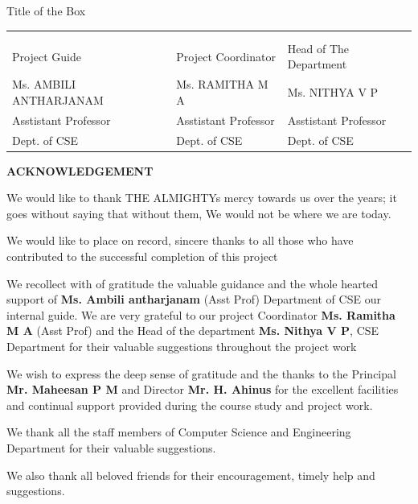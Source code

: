 \documentclass[12pt]{article}
\begin{document}
\begin{boxed}{Title of the Box}
\begin{center}
\begin{tabularx}{1\textwidth} { 
  >{\raggedright\arraybackslash}X 
   >{\raggedright\arraybackslash}X 
   >{\raggedright\arraybackslash}X }
\\  \\ \\ 

Project Guide & Project Coordinator & Head of The Department  \\  
Ms. AMBILI ANTHARJANAM  & Ms. RAMITHA  M A & Ms. NITHYA V P \\ 
Asstistant Professor  & Asstistant Professor &Asstistant Professor \\ 
Dept. of CSE & Dept. of CSE & Dept. of CSE   











\end{tabularx}
\end{center}


















\newpage
\vspace*{50px}
\begin{center}\LARGE\bf{ACKNOWLEDGEMENT}\end{center}

\thispagestyle{empty}We would like to thank THE ALMIGHTYs mercy towards us over the years;
it goes without saying that without them, We would not be where we are today. \\
\par We would like to place on record, sincere thanks to all those who have
contributed to the successful completion of this project\\
\par We recollect with of gratitude the valuable guidance and the whole hearted support of \textbf{Ms. Ambili antharjanam } (Asst Prof) Department of CSE our internal guide. We are very grateful to our project Coordinator\textbf{ Ms. Ramitha M A} (Asst Prof) and the Head of the department\textbf{ Ms. Nithya V P}, CSE Department for their valuable suggestions throughout the project work\\
\par We wish to express the deep sense of gratitude and the thanks to the Principal \textbf{Mr. Maheesan P M} and Director\textbf{ Mr. H. Ahinus} for the excellent facilities and continual support provided during the course study and project work. \\
\par We thank all the staff members of Computer Science and Engineering Department for their valuable suggestions. \\
\par We also thank all beloved friends for their encouragement, timely help and suggestions.\\


\end{boxed}
\end{document}
